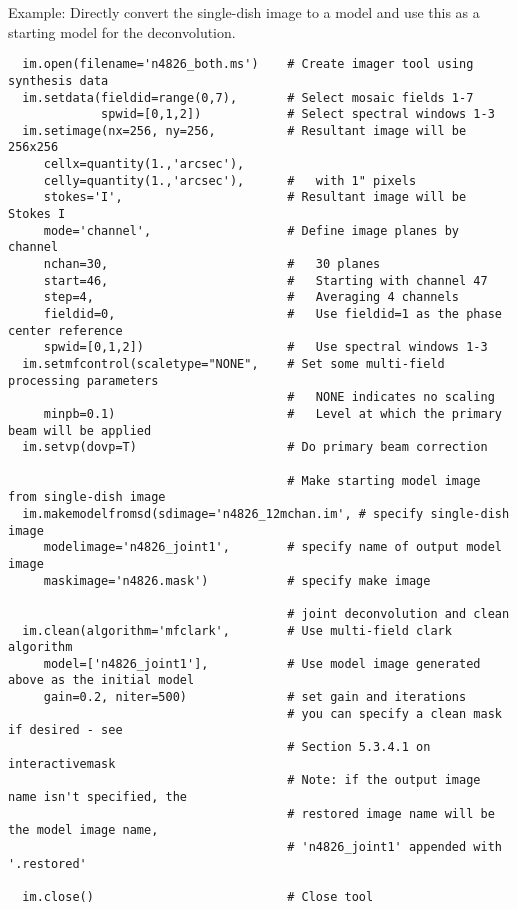 \vspace{3mm}

Example: Directly convert the single-dish image to a model and use
this as a starting model for the deconvolution.

\small
\begin{verbatim}
  im.open(filename='n4826_both.ms')    # Create imager tool using synthesis data
  im.setdata(fieldid=range(0,7),       # Select mosaic fields 1-7
             spwid=[0,1,2])            # Select spectral windows 1-3
  im.setimage(nx=256, ny=256,          # Resultant image will be 256x256
     cellx=quantity(1.,'arcsec'),
     celly=quantity(1.,'arcsec'),      #   with 1" pixels
     stokes='I',                       # Resultant image will be Stokes I
     mode='channel',                   # Define image planes by channel
     nchan=30,                         #   30 planes
     start=46,                         #   Starting with channel 47
     step=4,                           #   Averaging 4 channels
     fieldid=0,                        #   Use fieldid=1 as the phase center reference
     spwid=[0,1,2])                    #   Use spectral windows 1-3
  im.setmfcontrol(scaletype="NONE",    # Set some multi-field processing parameters
                                       #   NONE indicates no scaling
     minpb=0.1)                        #   Level at which the primary beam will be applied
  im.setvp(dovp=T)                     # Do primary beam correction

                                       # Make starting model image from single-dish image
  im.makemodelfromsd(sdimage='n4826_12mchan.im', # specify single-dish image
     modelimage='n4826_joint1',        # specify name of output model image
     maskimage='n4826.mask')           # specify make image

                                       # joint deconvolution and clean
  im.clean(algorithm='mfclark',        # Use multi-field clark algorithm
     model=['n4826_joint1'],           # Use model image generated above as the initial model
     gain=0.2, niter=500)              # set gain and iterations
                                       # you can specify a clean mask if desired - see
                                       # Section 5.3.4.1 on interactivemask
                                       # Note: if the output image name isn't specified, the
                                       # restored image name will be the model image name,
                                       # 'n4826_joint1' appended with '.restored'

  im.close()                           # Close tool
\end{verbatim}
\normalsize

